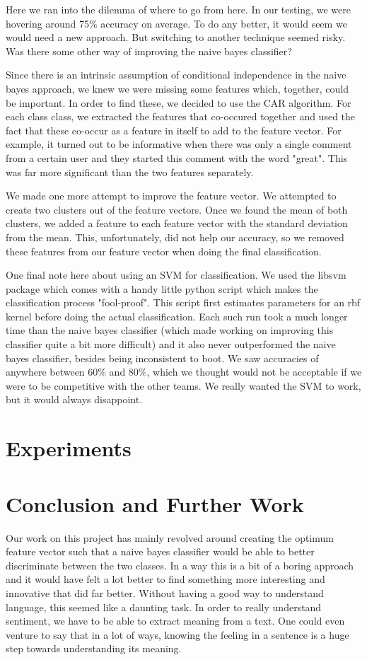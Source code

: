 \documentclass[]{report}
\begin{document}
Here we ran into the dilemma of where to go from here.  In our testing, we were hovering around 75\% accuracy on average.  To do any better, it would seem we would need a new approach.  But switching to another technique seemed risky.  Was there some other way of improving the naive bayes classifier?

Since there is an intrinsic assumption of conditional independence in the naive bayes approach, we knew we were missing some features which, together, could be important.  In order to find these, we decided to use the CAR algorithm.  For each class class, we extracted the features that co-occured together and used the fact that these co-occur as a feature in itself to add to the feature vector.  For example, it turned out to be informative when there was only a single comment from a certain user and they started this comment with the word "great".  This was far more significant than the two features separately.

We made one more attempt to improve the feature vector.  We attempted to create two clusters out of the feature vectors.  Once we found the mean of both clusters, we added a feature to each feature vector with the standard deviation from the mean.  This, unfortunately, did not help our accuracy, so we removed these features from our feature vector when doing the final classification.

One final note here about using an SVM for classification.  We used the libsvm package which comes with a handy little python script which makes the classification process "fool-proof".  This script first estimates parameters for an rbf kernel before doing the actual classification.  Each such run took a much longer time than the naive bayes classifier (which made working on improving this classifier quite a bit more difficult) and it also never outperformed the naive bayes classifier, besides being inconsistent to boot.  We saw accuracies of anywhere between 60\% and 80\%, which we thought would not be acceptable if we were to be competitive with the other teams.  We really wanted the SVM to work, but it would always disappoint.

\section{Experiments}
\section{Conclusion and Further Work}
Our work on this project has mainly revolved around creating the optimum feature vector such that a naive bayes classifier would be able to better discriminate between the two classes.  In a way this is a bit of a boring approach and it would have felt a lot better to find something more interesting and innovative that did far better.  Without having a good way to understand language, this seemed like a daunting task.  In order to really understand sentiment, we have to be able to extract meaning from a text.  One could even venture to say that in a lot of ways, knowing the feeling in a sentence is a huge step towards understanding its meaning.
\end{document}

